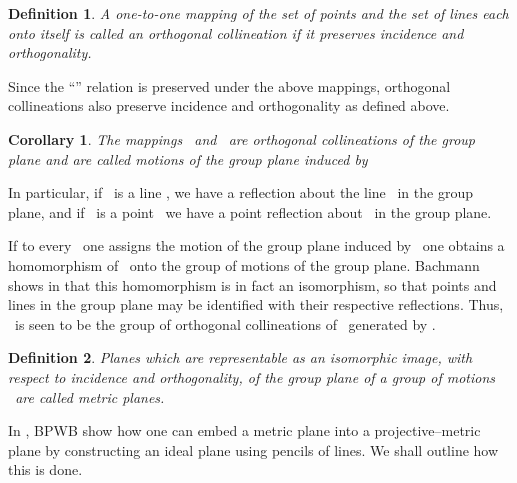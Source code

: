 \documentclass[a4paper,twoside,12pt]{article}
\newtheorem{cor}{Corollary}[section]
\newtheorem{definition}{Definition}[section]
\def\nind{\noindent}
\begin{document}
\begin{definition} A one-to-one mapping \myHighlight{$\sigma $}\coordHE{} of the set of points
and the set of lines each onto itself is called an \emph{orthogonal
collineation} if it preserves incidence and orthogonality.
\end{definition}

\nind Since the ``\myHighlight{$|$}\coordHE{}'' relation is preserved under the above
mappings, orthogonal collineations also preserve incidence and
orthogonality as defined above.

\begin{cor} The mappings \coordHE{}\ and \coordHE{}\ are
orthogonal collineations of the group plane and are called motions of the
group plane induced by \coordHE{}
\end{cor}

\nind In particular, if \myHighlight{$\alpha $}\coordHE{}\ is a line \coordHE{}, we have a reflection
about the line \coordHE{}\ in the group plane, and if \myHighlight{$\alpha $}\coordHE{}\ is a point
\coordHE{}\ we have a point reflection about \coordHE{}\ in the group plane.

     If to every \coordHE{}\ one assigns the motion of the group
plane induced by \myHighlight{$\alpha ,$}\coordHE{}\ one obtains a homomorphism of \coordHE{}\
onto the group of motions of the group plane. Bachmann shows in \cite{Ba} that
this homomorphism is in fact an isomorphism, so that points and lines in the
group plane may be identified with their respective reflections. Thus, 
\coordHE{}\ is seen to be the group of orthogonal collineations of 
\myHighlight{$\mathfrak{G}$}\coordHE{}\ generated by \myHighlight{$\mathcal{G}$}\coordHE{}.

\begin{definition} Planes which are representable as an isomorphic
image, with respect to incidence and orthogonality, of the group plane of a
group of motions \myHighlight{$(\mathfrak{G},\mathcal{G}),$}\coordHE{}\ are called metric planes.
\end{definition}

     In \cite{BBPW}, BPWB show how one can embed a metric plane into a
projective--metric plane by constructing an ideal plane using pencils of
lines. We shall outline how this is done.
\end{document}
